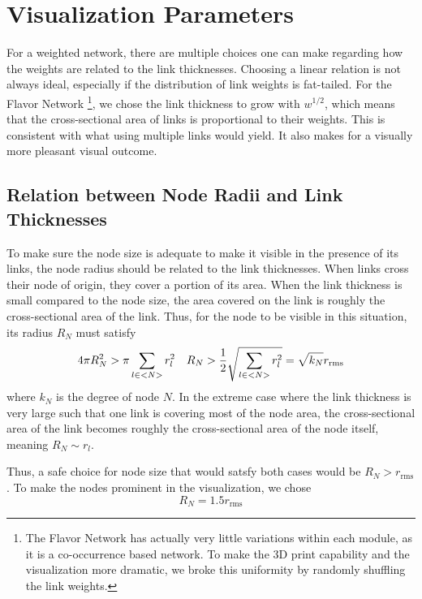 \documentclass[linenumbers,endfloats,nofootinbib,preprint,floatfix,titlepage,superscriptaddress]{revtex4-1} %
\begin{document}
\section{Visualization Parameters\label{ap:params}}
For a weighted network, there are multiple choices one can make regarding how the weights are related to the link thicknesses.
Choosing a linear relation is not always ideal, especially if the distribution of link weights is fat-tailed. 
For the Flavor Network \citep{ahn2011flavor}\footnote{The Flavor Network has actually very little variations within each module, as it is a co-occurrence based network. To make the 3D print capability and the visualization more dramatic, we broke this uniformity by randomly shuffling the link weights.}, we chose the link thickness to grow with $w^{1/2}$, which means that the cross-sectional area of links is proportional to their weights. 
This is consistent with what using multiple links would yield. 
It also makes for a  visually more pleasant visual outcome. 



\subsection{Relation between Node Radii and Link Thicknesses}
To make sure the node size is adequate to make it visible in the presence of its links, the node radius should be related to the link thicknesses. 
When links cross their node of origin, they cover a portion of its area.
When the link thickness is small compared to the node size, the area covered on the link is roughly the cross-sectional area of the link. 
Thus, for the node to be visible in this situation, its radius $R_N$ must satisfy
\begin{equation}
    4 \pi R_N^2 > \pi \sum_{l\in <N>} r_l^2 \quad R_N > {1\over 2} \sqrt{\sum_{l\in <N>} r_l^2} = \sqrt{k_N} r_{\mathrm{rms}}  
\end{equation}
where $k_N$ is the degree of node $N$.  
In the extreme case where the link thickness is very large such that one link is covering most of the node area, the cross-sectional area of the link becomes roughly the cross-sectional area of the node itself, meaning $R_N \sim r_l$. 

Thus, a safe choice for node size that would satsfy both cases would be 
$R_N > r_{\mathrm{rms}}$.
To make the nodes prominent in the visualization, we chose 
\[R_N = 1.5 r_{\mathrm{rms}}\]
\end{document}
